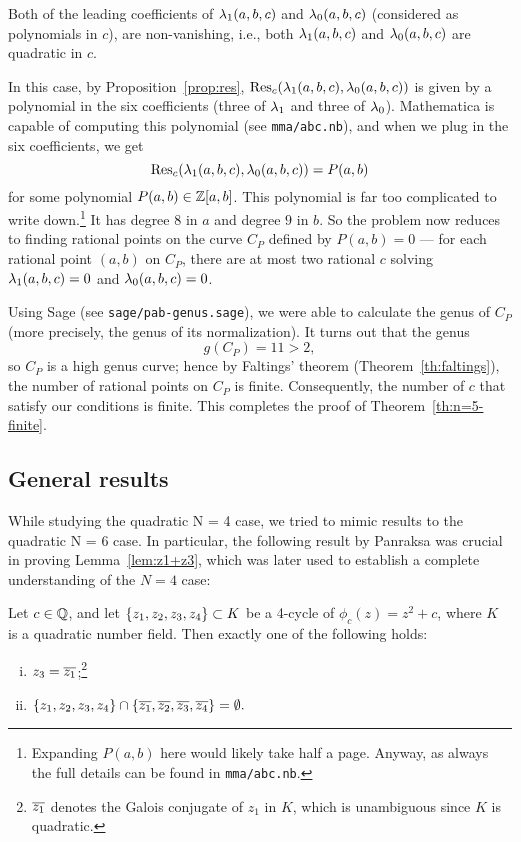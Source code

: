 \begin{case}
  Both of the leading coefficients of $\lambda_1(a, b, c)$ and $\lambda_0(a, b,
  c)$ (considered as polynomials in $c$), are non-vanishing, i.e.,
  both $\lambda_1(a, b, c)$ and $\lambda_0(a, b, c)$ are quadratic in $c$.

  In this case, by Proposition~\ref{prop:res}, $\mathrm{Res}_c(\lambda_1(a, b, c),
  \lambda_0(a, b, c))$ is given by a polynomial in the six coefficients
  (three of $\lambda_1$ and three of $\lambda_0$). Mathematica is capable of
  computing this polynomial (see \texttt{mma/abc.nb}), and when we
  plug in the six coefficients, we get
  \[
  \mathrm{Res}_c(\lambda_1(a, b, c), \lambda_0(a, b, c)) = P(a, b)
  \]
  for some polynomial $P(a, b) \in \mathbb{Z}[a, b]$. This polynomial is far
  too complicated to write down.\footnote{%
    Expanding $P(a, b)$ here would likely take half a page. Anyway,
    as always the full details can be found in \texttt{mma/abc.nb}.}
  It has degree $8$ in $a$ and degree $9$ in $b$. So the problem now
  reduces to finding rational points on the curve $C_P$ defined by
  $P(a, b) = 0$ --- for each rational point $(a, b)$ on $C_P$, there
  are at most two rational $c$ solving $\lambda_1(a, b, c) = 0$ and
  $\lambda_0(a, b, c) = 0$.

  Using Sage (see \texttt{sage/pab-genus.sage}), we were able to
  calculate the genus of $C_P$ (more precisely, the genus of its
  normalization). It turns out that the genus
  \[
  g(C_P) = 11 > 2,
  \]
  so $C_P$ is a high genus curve; hence by Faltings' theorem
  (Theorem~\ref{th:faltings}), the number of rational points on $C_P$
  is finite. Consequently, the number of $c$ that satisfy our
  conditions is finite. This completes the proof of
  Theorem~\ref{th:n=5-finite}.
\end{case}

\subsection{General results}
\label{subsec:general}

While studying the quadratic N = 4 case, we tried to mimic results
to the quadratic N = 6 case. In particular, the following result by
Panraksa was crucial in proving Lemma~\ref{lem:z1+z3}, which was later
used to establish a complete understanding of the $N = 4$ case:

\begin{theorem} 
  Let $c \in \mathbb{Q}$, and let $\left\{z_1, z_2, z_3, z_4\right\} \subset K$ be a
  4-cycle of $\phi_c(z) = z^2 + c$, where $K$ is a quadratic number
  field. Then exactly one of the following holds:
  \begin{enumerate}[(i)]
  \item $z_3 = \overline{z_1}$;\footnote{%
      $\overline{z_1}$ denotes the Galois conjugate of $z_1$ in $K$, which
      is unambiguous since $K$ is quadratic.}

  \item $\{z_1, z_2, z_3, z_4\} \cap \{\overline{z_1}, \overline{z_2}, \overline{z_3},
    \overline{z_4}\} =\emptyset.$
  \end{enumerate}
\end{theorem}

